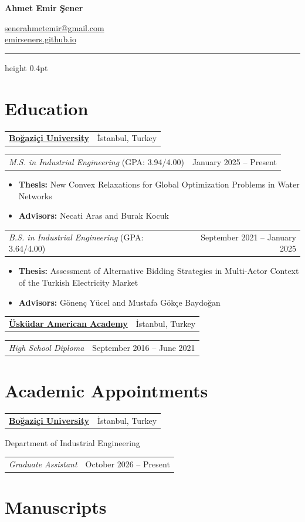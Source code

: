 \documentclass[a4paper,11pt]{article}
\makeatletter
\newcommand{\cvsection}[1]{\Needspace{4\baselineskip}\section*{#1}}
\newcommand{\cvline}[2]{%
  \begin{tabularx}{\linewidth}[t]{@{}>{\raggedright\arraybackslash}X r@{}}%
    #1 & #2 \\
  \end{tabularx}\par
}
\newcommand{\cvheading}[2]{\Needspace{3\baselineskip}\cvline{#1}{#2}}
\newcommand{\entrygap}{\par\vspace{6pt}}
\makeatother
\begin{document}
\begin{minipage}[c]{0.53\linewidth}
  {\fontsize{16pt}{23pt}\selectfont\bfseries Ahmet Emir Şener}
\end{minipage}\hfill
\begin{minipage}[c]{0.45\linewidth}
  \raggedleft
  \href{mailto:senerahmetemir@gmail.com}{senerahmetemir@gmail.com}\\
  \href{https://emirseners.github.io/}{emirseners.github.io}
\end{minipage}\par
\vspace{6pt}
\hrule height 0.4pt

\cvsection{Education}

\cvheading{\textbf{\href{https://bogazici.edu.tr/}{Boğaziçi University}}}{İstanbul, Turkey}
\cvheading{\textit{M.S. in Industrial Engineering} (GPA: 3.94/4.00)}{January 2025 -- Present}
\begin{itemize}
  \item \textbf{Thesis:} New Convex Relaxations for Global Optimization Problems in Water Networks
  \item \textbf{Advisors:} Necati Aras and Burak Kocuk
\end{itemize}

\entrygap
\cvheading{\textit{B.S. in Industrial Engineering} (GPA: 3.64/4.00)}{September 2021 -- January 2025}
\begin{itemize}
  \item \textbf{Thesis:} {\fontsize{10.5pt}{12.5pt}\selectfont Assessment of Alternative Bidding Strategies in Multi-Actor Context of the Turkish Electricity Market}
  \item \textbf{Advisors:} Gönenç Yücel and Mustafa Gökçe Baydoğan
\end{itemize}

\entrygap
\cvheading{\textbf{\href{https://www.uaa.k12.tr/}{Üsküdar American Academy}}}{İstanbul, Turkey}
\cvheading{\textit{High School Diploma}}{September 2016 -- June 2021}

\cvsection{Academic Appointments}

\cvheading{\textbf{\href{https://bogazici.edu.tr/}{Boğaziçi University}}}{İstanbul, Turkey}
Department of Industrial Engineering\par
\cvheading{\textit{Graduate Assistant}}{October 2026 -- Present}

\cvsection{Manuscripts}
\end{document}

